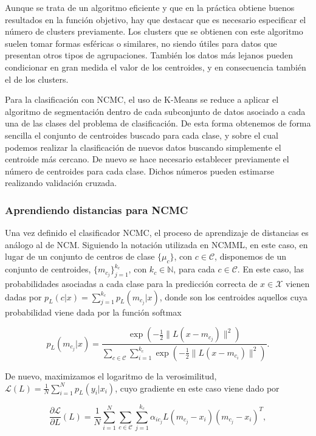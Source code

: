 Aunque se trata de un algoritmo eficiente y que en la práctica obtiene buenos resultados en la función objetivo, hay que destacar que es necesario especificar el número de clusters previamente. Los clusters que se obtienen con este algoritmo suelen tomar formas esféricas o similares, no siendo útiles para datos que presentan otros tipos de agrupaciones. También los datos más lejanos pueden condicionar en gran medida el valor de los centroides, y en consecuencia también el de los clusters.

Para la clasificación con NCMC, el uso de K-Means se reduce a aplicar el algoritmo de segmentación dentro de cada subconjunto de datos asociado a cada una de las clases del problema de clasificación. De esta forma obtenemos de forma sencilla el conjunto de centroides buscado para cada clase, y sobre el cual podemos realizar la clasificación de nuevos datos buscando simplemente el centroide más cercano. De nuevo se hace necesario establecer previamente el número de centroides para cada clase. Dichos números pueden estimarse realizando validación cruzada. 


\subsubsection{Aprendiendo distancias para NCMC}

Una vez definido el clasificador NCMC, el proceso de aprendizaje de distancias es análogo al de NCM. Siguiendo la notación utilizada en NCMML, en este caso, en lugar de un conjunto de centros de clase $\{\mu_c\}$, con $c \in \mathcal{C}$, disponemos de un conjunto de centroides, $\{m_{c_j}\}_{j=1}^{k_c}$, con $k_c \in \mathbb{N}$, para cada $c \in \mathcal{C}$. En este caso, las probabilidades asociadas a cada clase para la predicción correcta de $x \in \mathcal{X}$ vienen dadas por $p_L(c|x) = \sum_{j=1}^{k_c} p_L(m_{c_j}|x)$, donde son los centroides aquellos cuya probabilidad viene dada por la función softmax

\begin{equation}
    p_L(m_{c_j}|x) = \frac{\exp\left( -\frac{1}{2} \|L(x-m_{c_j})\|^2 \right)}{ \sum\limits_{c \in \mathcal{C}} \sum\limits_{i=1}^{k_c} \exp\left( -\frac{1}{2} \|L(x-m_{c_i})\|^2 \right) }.
\end{equation}

De nuevo, maximizamos el logaritmo de la verosimilitud, $\mathcal{L}(L) = \frac{1}{N}\sum_{i=1}^N p_L(y_i|x_i)$, cuyo gradiente en este caso viene dado por

\begin{equation*}
    \frac{\partial \mathcal{L}}{\partial L}(L) = \frac{1}{N} \sum_{i=1}^N \sum_{c \in \mathcal{C}} \sum_{j=1}^{k_c} \alpha_{ic_j} L (m_{c_j}-x_i)(m_{c_j}-x_i)^T,
\end{equation*}

